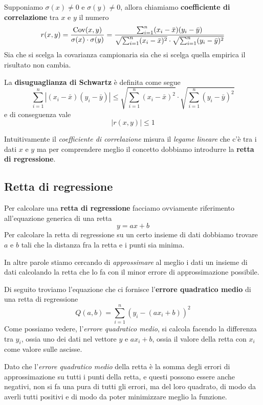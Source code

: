 \begin{definition}
	Supponiamo $\sigma (x) \neq 0$ e $\sigma (y) \neq 0$, allora chiamiamo
	\textbf{coefficiente di correlazione} tra $x$ e $y$ il numero
	\[
		r(x, y) = \frac{\operatorname{Cov} (x, y)}{\sigma (x) \cdot \sigma (y)} =
		\frac{\sum_{i=1}^n (x_i - \bar{x})(y_i - \bar{y})}
		{\sqrt{\sum_{i=1}^n (x_i - \bar{x})^2} \cdot
			\sqrt{\sum_{i=1}^n (y_i - \bar{y})^2}}
	\]
	Sia che si scelga la covarianza campionaria sia che si scelga quella empirica il risultato
	non cambia.
\end{definition}

\begin{definition}
	La \textbf{disuguaglianza di Schwartz} è definita come segue
	\[
		\sum_{i=1}^n |(x_i - \bar{x}) (y_i - \bar{y})| \leq
		\sqrt{\sum_{i=1}^n (x_i - \bar{x})^2} \cdot \sqrt{\sum_{i=1}^n (y_i - \bar{y})^2}
	\]
	e di conseguenza vale \[ |r(x, y)| \leq 1 \]
\end{definition}

Intuitivamente il \emph{coefficiente di correlazione} misura il \emph{legame lineare} che c'è tra
i dati $x$ e $y$ ma per comprendere meglio il concetto dobbiamo introdurre la
\textbf{retta di regressione}.

\subsection{Retta di regressione}
Per calcolare una \textbf{retta di regressione} facciamo ovviamente riferimento all'equazione
generica di una retta
\[ y = a x + b \]
Per calcolare la retta di regressione su un certo insieme di dati dobbiamo trovare $a$ e $b$ tali
che la distanza fra la retta e i punti sia minima.

In altre parole stiamo cercando di \emph{approssimare} al meglio i dati un insieme di dati
calcolando la retta che lo fa con il minor errore di approssimazione possibile.

Di seguito troviamo l'equazione che ci fornisce l'\textbf{errore quadratico medio} di una retta di
regressione
\[ Q(a, b) = \sum_{i=1}^n (y_i - (a x_i + b))^2 \]
Come possiamo vedere, l'\emph{errore quadratico medio}, si calcola facendo la differenza tra
$y_i$, ossia uno dei dati nel vettore $y$ e $a x_i + b$, ossia il valore della retta con $x_i$
come valore sulle ascisse.

Dato che l'\emph{errore quadratico medio} della retta è la somma degli errori di approssimazione
su tutti i punti della retta, e questi possono essere anche negativi, non si fa una pura di tutti
gli errori, ma del loro quadrato, di modo da averli tutti positivi e di modo da poter minimizzare
meglio la funzione.

